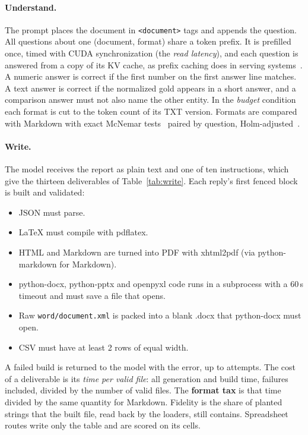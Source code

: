 \paragraph{Understand.} The prompt places the document in
\texttt{<document>} tags and appends the question. All questions about one
(document, format) share a token prefix. It is prefilled once, timed with
CUDA synchronization (the \emph{read latency}), and each question is
answered from a copy of its KV cache, as prefix caching does in serving
systems~\cite{kwon2023vllm}. A numeric answer is correct if the first
number on the first answer line matches. A text answer is correct if the
normalized gold appears in a short answer, and a comparison answer must not
also name the other entity. In the \emph{budget} condition each format is
cut to the token count of its TXT version. Formats are compared with
Markdown with exact McNemar tests~\cite{mcnemar1947} paired by question,
Holm-adjusted~\cite{holm1979}.

\paragraph{Write.} The model receives the report as plain text and one of
ten instructions, which give the thirteen deliverables of
Table~\ref{tab:write}. Each reply's first fenced block
is built and validated:
\begin{itemize}
\item JSON must parse.
\item LaTeX must compile with pdflatex.
\item HTML and Markdown are turned into PDF with xhtml2pdf (via
  python-markdown for Markdown).
\item python-docx, python-pptx and openpyxl code runs in a subprocess with
  a 60\,s timeout and must save a file that opens.
\item Raw \texttt{word/document.xml} is packed into a blank .docx that
  python-docx must open.
\item CSV must have at least 2 rows of equal width.
\end{itemize}
A failed build is returned to the model with the error, up to
\MaxAttempts{} attempts. The cost of a deliverable is its \emph{time per
valid file}: all generation and build time, failures included, divided by
the number of valid files. The \textbf{format tax} is that time divided by
the same quantity for Markdown. Fidelity is the share of planted strings
that the built file, read back by the loaders, still contains.
Spreadsheet routes write only the table and are scored on its cells.
